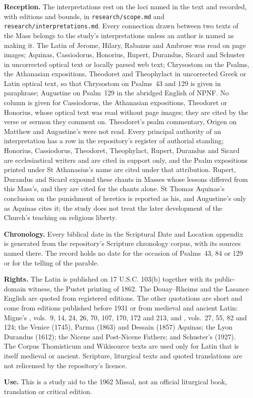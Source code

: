{\textbf{Reception.} The interpretations rest on the loci named in the text and
recorded, with editions and bounds, in \texttt{research/scope.md} and
\texttt{research/interpretations.md}. Every connection drawn between two texts
of the Mass belongs to the study's interpretations unless an author is named as
making it. The Latin of Jerome, Hilary, Rabanus and Ambrose was read on page
images; Aquinas, Cassiodorus, Honorius, Rupert, Durandus, Sicard and Schuster
in uncorrected optical text or locally parsed web text; Chrysostom on the
Psalms, the Athanasian expositions, Theodoret and Theophylact in uncorrected
Greek or Latin optical text, so that Chrysostom on Psalms~43 and 129 is given
in paraphrase; Augustine on Psalm~129 in the abridged English of NPNF. No
column is given for Cassiodorus, the Athanasian expositions, Theodoret or
Honorius, whose optical text was read without page images; they are cited by
the verse or sermon they comment on. Theodoret's psalm
commentary, Origen on Matthew and Augustine's  were not read. Every principal authority of an interpretation has
a row in the repository's register of authorial standing; Honorius,
Cassiodorus, Theodoret, Theophylact, Rupert, Durandus and Sicard are
ecclesiastical writers and are cited in support only, and the Psalm
expositions printed under St Athanasius's name are cited under that
attribution. Rupert, Durandus and Sicard expound these chants in Masses whose
lessons differed from this Mass's, and they are cited for the chants alone.
St Thomas Aquinas's conclusion on the punishment of heretics is reported as
his, and Augustine's  only as Aquinas cites
it; the study does not treat the later development of the Church's teaching
on religious liberty.

\textbf{Chronology.} Every biblical date in the Scriptural Date and Location
appendix is generated from the repository's Scripture chronology corpus, with
its sources named there. The record holds no date for the occasion of
Psalms~43, 84 or 129 or for the telling of the parable.

\textbf{Rights.} The Latin is published on 17 U.S.C. 103(b) together with its
public-domain witness, the Pustet printing of 1862. The Douay--Rheims and the
Lasance English are quoted from registered editions. The other quotations are
short and come from editions published before 1931 or from medieval and
ancient Latin: Migne's , vols.~9, 14, 24, 26, 70, 107,
170, 172 and 213, and , vols.~27, 55, 82 and 124; the
Venice (1745), Parma (1863) and Dessain (1857) Aquinas; the Lyon Durandus
(1612); the Nicene and Post-Nicene Fathers; and Schuster's 
(1927). The Corpus Thomisticum and Wikisource texts are used only for Latin
that is itself medieval or ancient. Scripture, liturgical texts and quoted
translations are not relicensed by the repository's licence.

\textbf{Use.} This is a study aid to the 1962 Missal, not an official
liturgical book, translation or critical edition.
\par}

